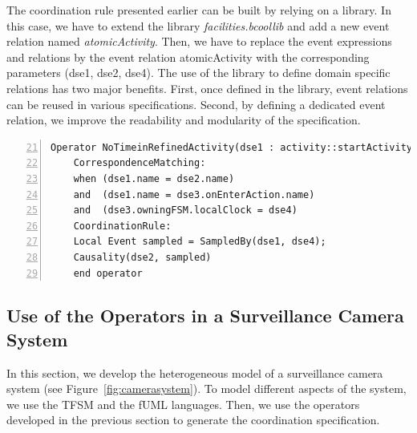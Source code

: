 	The coordination rule presented earlier can be built by relying on a \bcool library. In this case, we have to extend the library \emph{facilities.bcoollib} and add a new event relation named \emph{atomicActivity}. Then, we have to replace the event expressions and relations by the event relation atomicActivity with the corresponding parameters (\ie dse1, dse2, dse4). The use of the library to define domain specific relations has two major benefits. First, once defined in the library, event relations can be reused in various \bcool specifications. Second, by defining a dedicated event relation, we improve the readability and modularity of the \bcool specification.  %
	
	\begin{lstlisting}[language=bcool,
	caption={Timing coordination operator between TFSM and fUML language},
	label={fig:bcooltimeinactions}, 
	basicstyle=\scriptsize\ttfamily, backgroundcolor=\color{LGrey}, numbers=left,firstnumber=21, xleftmargin=2pt, aboveskip=3pt] 
	Operator NoTimeinRefinedActivity(dse1 : activity::startActivity, dse2 : activity::finishActivity, dse3 : tfsm::entering, dse4 : tfsm::ticks)
	CorrespondenceMatching:
	when (dse1.name = dse2.name)
	and  (dse1.name = dse3.onEnterAction.name)
	and  (dse3.owningFSM.localClock = dse4)
	CoordinationRule:
	Local Event sampled = SampledBy(dse1, dse4);
	Causality(dse2, sampled)
	end operator	 
	\end{lstlisting}
	
	\subsection{Use of the Operators in a Surveillance Camera System}
	In this section, we develop the heterogeneous model of a surveillance camera system (see Figure~\ref{fig:camerasystem}). To model different aspects of the system, we use the TFSM and the fUML languages. Then, we use the operators developed in the previous section to generate the coordination specification. 
	

